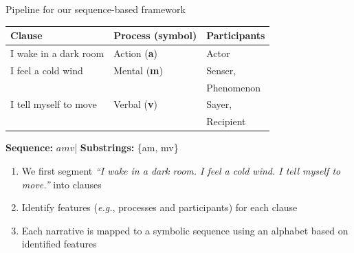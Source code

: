 \documentclass[handout,10pt]{beamer}
\begin{document}
\begin{frame}{Pipeline for our sequence-based framework}


\begin{table}[!ht]
  \centering
  \small
  \renewcommand{\arraystretch}{1.1}
  \begin{threeparttable}
    \label{tab:example}
    \begin{tabular}{lll}
      \textbf{Clause} & \textbf{Process (symbol)} & \textbf{Participants} \\
      \midrule
      I wake in a dark room         & Action (\textbf{a})  & Actor \\
      I feel a cold wind            & Mental (\textbf{m})  & Senser,\\
                                            &             & Phenomenon \\
      I tell myself to move         & Verbal (\textbf{v})  & Sayer,\\
                                            &             & Recipient \\
      \bottomrule
    \end{tabular}

    \begin{tablenotes}[flushleft]
      \footnotesize
      \item \textbf{Sequence:} $amv$\quad|\quad
            \textbf{Substrings:} \{am, mv\}
    \end{tablenotes}
  \end{threeparttable}
\end{table}

\pause

\begin{enumerate}[<+->]
    \item We first segment \textit{“I wake in a dark room. I feel a cold wind. I tell myself to move.”} into clauses
    \item Identify features (\textit{e.g.}, processes and participants) for each clause
    \item Each narrative is mapped to a symbolic sequence using an alphabet based on identified features
\end{enumerate}

    
\end{frame}
\end{document}
